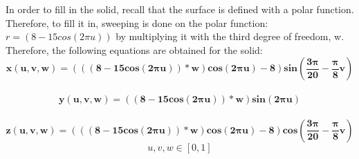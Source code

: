 \documentclass[acmlarge,nonacm=true]{acmart}
\begin{document}
In order to fill in the solid, recall that the surface is defined with a polar function. Therefore, to fill it in, 
sweeping is done on the polar function: \(r = (8 - 15cos(2\pi u))\) by multiplying it with the third degree of freedom, w.\\
Therefore, the following equations are obtained for the solid:\\
\begin{displaymath}
	\mathbf{x(u,v,w) =  (((8 - 15cos(2\pi u))*w)cos(2\pi u)-8)sin(\frac{3\pi}{20} - \frac{\pi}{8}v)}
\end{displaymath}\\
\begin{displaymath}
	\mathbf{y(u,v,w) =  ((8 - 15cos(2\pi u))*w)sin(2\pi u)}
\end{displaymath}\\
\begin{displaymath}
	\mathbf{z(u,v,w) =  (((8 - 15cos(2\pi u))*w)cos(2\pi u)-8)cos(\frac{3\pi}{20} - \frac{\pi}{8}v)}
\end{displaymath}
\begin{displaymath}
	u,v,w \in [0, 1]
\end{displaymath}
\end{document}

